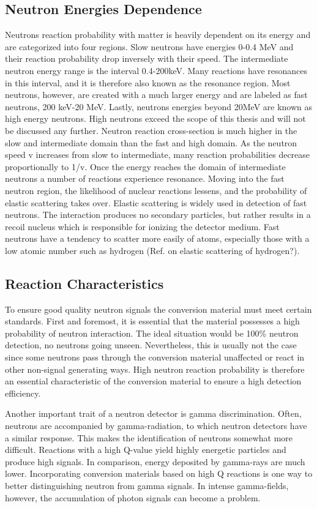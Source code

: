 \subsection{Neutron Energies Dependence}
Neutrons reaction probability with matter is heavily dependent on its energy and are categorized into four regions. Slow neutrons have energies 0-0.4 MeV and their reaction probability drop inversely with their speed. The intermediate neutron energy range is the interval 0.4-200keV. Many reactions have resonances in this interval, and it is therefore also known as the resonance region. Most neutrons, however, are created with a much larger energy and are labeled as fast neutrons, 200 keV-20 MeV. Lastly, neutrons energies beyond 20MeV are known as high energy neutrons. High neutrons exceed the scope of this thesis and will not be discussed any further.
Neutron reaction cross-section is much higher in the slow and intermediate domain than the fast and high domain. As the neutron speed v increases from slow to intermediate, many reaction probabilities decrease proportionally to 1/v. Once the energy reaches the domain of intermediate neutrons a number of reactions experience resonance. Moving into the fast neutron region, the likelihood of nuclear reactions lessens, and the probability of elastic scattering takes over.
Elastic scattering is widely used in detection of fast neutrons. The interaction produces no secondary particles, but rather results in a recoil nucleus which is responsible for ionizing the detector medium. Fast neutrons have a tendency to scatter more easily of atoms, especially those with a low atomic number such as hydrogen (Ref. on elastic scattering of hydrogen?).

\subsection{Reaction Characteristics}
To ensure good quality neutron signals the conversion material must meet certain standards. First and foremost, it is essential that the material possesses a high probability of neutron interaction. The ideal situation would be 100\% neutron detection, no neutrons going unseen. Nevertheless, this is usually not the case since some neutrons pass through the conversion material unaffected or react in other non-signal generating ways. High neutron reaction probability is therefore an essential characteristic of the conversion material to ensure a high detection efficiency.

Another important trait of a neutron detector is gamma discrimination. Often, neutrons are accompanied by gamma-radiation, to which neutron detectors have a similar response. This makes the identification of neutrons somewhat more difficult. Reactions with a high Q-value yield highly energetic particles and produce high signals. In comparison, energy deposited by gamma-rays are much lower. Incorporating conversion materials based on high Q reactions is one way to better distinguishing neutron from gamma signals. In intense gamma-fields, however, the accumulation of photon signals can become a problem.


